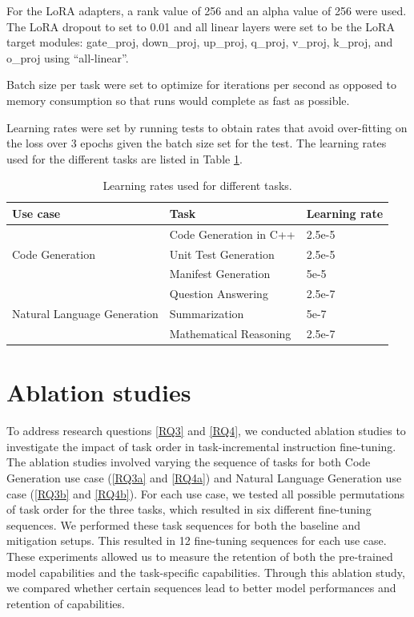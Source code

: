 For the LoRA adapters, a rank value of 256 and an alpha value of 256 were used. The LoRA dropout to set to 0.01 and all linear layers were set to be the LoRA target modules: gate\_proj, down\_proj, up\_proj, q\_proj, v\_proj, k\_proj, and o\_proj using “all-linear”. 

Batch size per task were set to optimize for iterations per second as opposed to memory consumption so that runs would complete as fast as possible.

Learning rates were set by running tests to obtain rates that avoid over-fitting on the loss over 3 epochs given the batch size set for the test. The learning rates used for the different tasks are listed in Table \ref{tab:lr}.
\begin{table}[h!]
\centering
\caption{Learning rates used for different tasks.}
\label{tab:lr}
\begin{tabular}{| m{5cm} | m{6cm} | m{3cm} |}
\hline
\textbf{Use case} & \textbf{Task} & \textbf{Learning rate} \\
\hline
\multirow{3}{*}{Code Generation} & Code Generation in C++ & 2.5e-5 \\
& Unit Test Generation & 2.5e-5 \\
& Manifest Generation & 5e-5 \\
\hline
\multirow{3}{*}{Natural Language Generation} & Question Answering & 2.5e-7 \\
& Summarization & 5e-7 \\
& Mathematical Reasoning & 2.5e-7 \\
\hline
\end{tabular}
\end{table}

\section{Ablation studies}
To address research questions \ref{RQ3} and \ref{RQ4}, we conducted ablation studies to investigate the impact of task order in task-incremental instruction fine-tuning. The ablation studies involved varying the sequence of tasks for both Code Generation use case (\ref{RQ3a} and \ref{RQ4a}) and  Natural Language Generation use case (\ref{RQ3b} and \ref{RQ4b}). For each use case, we tested all possible permutations of task order for the three tasks, which resulted in six different fine-tuning sequences. We performed these task sequences for both the baseline and mitigation setups. This resulted in 12 fine-tuning sequences for each use case. These experiments allowed us to measure the retention of both the pre-trained model capabilities and the task-specific capabilities. Through this ablation study, we compared whether certain sequences lead to better model performances and retention of capabilities.

